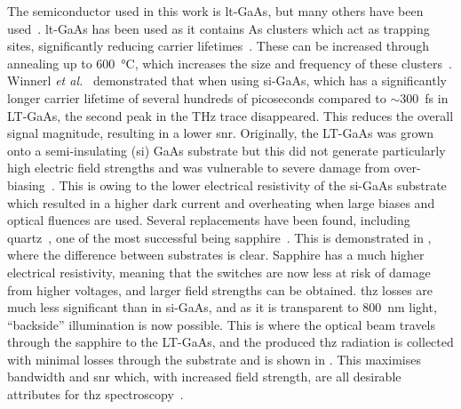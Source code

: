 The semiconductor used in this work is \acrfull{lt}-GaAs, but many others have been used~\cite{Burford2017, Bacon2021, Murakumo2016, Dietz2013, Gu2002, Bertulis2006, Collier2016}. \acrshort{lt}\nobreakdash-GaAs has been used as it contains As clusters which act as trapping sites, significantly reducing carrier lifetimes~\cite{Segschneider1997}. These can be increased through annealing up to \SI{600}{\degreeCelsius}, which increases the size and frequency of these clusters~\cite{Gregory2003}. Winnerl \textit{et al.}~\cite{Winnerl2008} demonstrated that when using \acrshort{si}\nobreakdash-GaAs, which has a significantly longer carrier lifetime of several hundreds of picoseconds compared to \(\sim\)\SI{300}{\femto\second} in LT-GaAs, the second peak in the THz trace disappeared. This reduces the overall signal magnitude, resulting in a lower \acrshort{snr}.
Originally, the LT\nobreakdash-GaAs was grown onto a semi\nobreakdash-insulating (\acrshort{si}) GaAs substrate but this did not generate particularly high electric field strengths and was vulnerable to severe damage from over\nobreakdash-biasing~\cite{Bacon2017}. This is owing to the lower electrical resistivity of the \acrshort{si}-GaAs substrate which resulted in a higher dark current and overheating when large biases and optical fluences are used. Several replacements have been found, including quartz~\cite{Bacon2017}, one of the most successful being sapphire~\cite{Russell2013, Bacon2021}. This is demonstrated in , where the difference between substrates is clear. Sapphire has a much higher electrical resistivity, meaning that the switches are now less at risk of damage from higher voltages, and larger field strengths can be obtained. \acrshort{thz} losses are much less significant than in \acrshort{si}\nobreakdash-GaAs, and as it is transparent to \SI{800}{nm} light, “backside” illumination is now possible. This is where the optical beam travels through the sapphire to the LT\nobreakdash-GaAs, and the produced \acrshort{thz} radiation is collected with minimal losses through the substrate and is shown in . This maximises bandwidth and \acrshort{snr} which, with increased field strength, are all desirable attributes for \acrshort{thz} spectroscopy~\cite{Bacon2017}.

